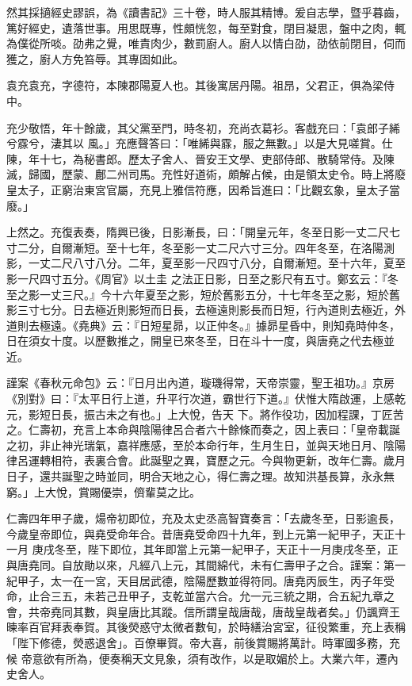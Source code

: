 \begin{pinyinscope}
 然其採擿經史謬誤，為《讀書記》三十卷，時人服其精博。爰自志學，暨乎暮齒，篤好經史，遺落世事。用思既專，性頗恍忽，每至對食，閉目凝思，盤中之肉，輒為僕從所啖。劭弗之覺，唯責肉少，數罰廚人。廚人以情白劭，劭依前閉目，伺而獲之，廚人方免笞辱。其專固如此。



 袁充袁充，字德符，本陳郡陽夏人也。其後寓居丹陽。祖昂，父君正，俱為梁侍中。



 充少敬悟，年十餘歲，其父黨至門，時冬初，充尚衣葛衫。客戲充曰：「袁郎子絺兮霡兮，淒其以
 風。」充應聲答曰：「唯絺與霡，服之無數。」以是大見嗟賞。仕陳，年十七，為秘書郎。歷太子舍人、晉安王文學、吏部侍郎、散騎常侍。及陳滅，歸國，歷蒙、鄜二州司馬。充性好道術，頗解占候，由是領太史令。時上將廢皇太子，正窮治東宮官屬，充見上雅信符應，因希旨進曰：「比觀玄象，皇太子當廢。」



 上然之。充復表奏，隋興已後，日影漸長，曰：「開皇元年，冬至日影一丈二尺七寸二分，自爾漸短。至十七年，冬至影一丈二尺六寸三分。四年冬至，在洛陽測影，一丈二尺八寸八分。二年，夏至影一尺四寸八分，自爾漸短。至十六年，夏至影一尺四寸五分。《周官》以土圭
 之法正日影，日至之影尺有五寸。鄭玄云：『冬至之影一丈三尺。』今十六年夏至之影，短於舊影五分，十七年冬至之影，短於舊影三寸七分。日去極近則影短而日長，去極遠則影長而日短，行內道則去極近，外道則去極遠。《堯典》云：『日短星昴，以正仲冬。』據昴星昏中，則知堯時仲冬，日在須女十度。以歷數推之，開皇已來冬至，日在斗十一度，與唐堯之代去極並近。



 謹案《春秋元命包》云：『日月出內道，璇璣得常，天帝崇靈，聖王祖功。』京房《別對》曰：『太平日行上道，升平行次道，霸世行下道。』伏惟大隋啟運，上感乾元，影短日長，振古未之有也。」上大悅，告天
 下。將作役功，因加程課，丁匠苦之。仁壽初，充言上本命與陰陽律呂合者六十餘條而奏之，因上表曰：「皇帝載誕之初，非止神光瑞氣，嘉祥應感，至於本命行年，生月生日，並與天地日月、陰陽律呂運轉相符，表裏合會。此誕聖之異，寶歷之元。今與物更新，改年仁壽。歲月日子，還共誕聖之時並同，明合天地之心，得仁壽之理。故知洪基長算，永永無窮。」上大悅，賞賜優崇，儕輩莫之比。



 仁壽四年甲子歲，煬帝初即位，充及太史丞高智寶奏言：「去歲冬至，日影逾長，今歲皇帝即位，與堯受命年合。昔唐堯受命四十九年，到上元第一紀甲子，天正十一月
 庚戌冬至，陛下即位，其年即當上元第一紀甲子，天正十一月庚戌冬至，正與唐堯同。自放勛以來，凡經八上元，其間綿代，未有仁壽甲子之合。謹案：第一紀甲子，太一在一宮，天目居武德，陰陽歷數並得符同。唐堯丙辰生，丙子年受命，止合三五，未若己丑甲子，支乾並當六合。允一元三統之期，合五紀九章之會，共帝堯同其數，與皇唐比其蹤。信所謂皇哉唐哉，唐哉皇哉者矣。」仍諷齊王暕率百官拜表奉賀。其後熒惑守太微者數旬，於時繕治宮室，征役繁重，充上表稱「陛下修德，熒惑退舍」。百僚畢賀。帝大喜，前後賞賜將萬計。時軍國多務，充候
 帝意欲有所為，便奏稱天文見象，須有改作，以是取媚於上。大業六年，遷內史舍人。




\end{pinyinscope}
